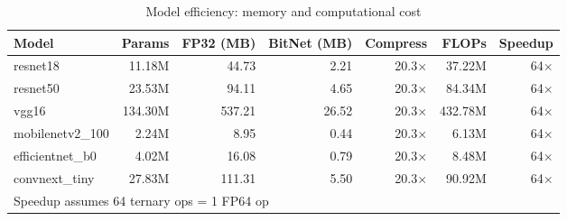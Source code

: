 \begin{table}[h]
\centering
\caption{Model efficiency: memory and computational cost}
\label{tab:efficiency}
\begin{tabular}{lrrrrrr}
\toprule
Model & Params & FP32 (MB) & BitNet (MB) & Compress & FLOPs & Speedup \\
\midrule
resnet18 & 11.18M & 44.73 & 2.21 & 20.3$\times$ & 37.22M & 64$\times$ \\
resnet50 & 23.53M & 94.11 & 4.65 & 20.3$\times$ & 84.34M & 64$\times$ \\
vgg16 & 134.30M & 537.21 & 26.52 & 20.3$\times$ & 432.78M & 64$\times$ \\
mobilenetv2_100 & 2.24M & 8.95 & 0.44 & 20.3$\times$ & 6.13M & 64$\times$ \\
efficientnet_b0 & 4.02M & 16.08 & 0.79 & 20.3$\times$ & 8.48M & 64$\times$ \\
convnext_tiny & 27.83M & 111.31 & 5.50 & 20.3$\times$ & 90.92M & 64$\times$ \\
\bottomrule
\multicolumn{7}{l}{\footnotesize Speedup assumes 64 ternary ops = 1 FP64 op} \\
\end{tabular}
\end{table}